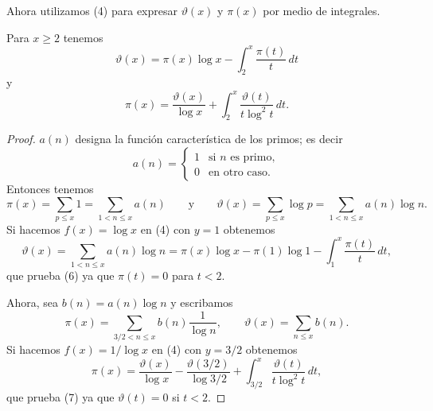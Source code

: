 \documentclass[12pt,a4paper]{book}
\begin{document}
    Ahora utilizamos (4) para expresar $\vartheta(x)$ y $\pi(x)$ por medio de
    integrales.

    \begin{teorema}
        Para $x\geq2$ tenemos
        \begin{equation}
            \vartheta(x)=\pi(x)\log x-\int_2^x\frac{\pi(t)}{t}\,dt
        \end{equation}
        y
        \begin{equation}
            \pi(x)=\frac{\vartheta(x)}{\log x}+\int_2^x\frac{\vartheta(t)}{t\log^2t}\,dt.
        \end{equation}
    \end{teorema}

    \begin{proof}
        $a(n)$ designa la función característica de los primos; es decir
        \begin{equation*}
            a(n)=
            \begin{cases}
                1 & \text{si } n \text{ es primo},\\
                0 & \text{en otro caso}.
            \end{cases}
        \end{equation*}
        Entonces tenemos
        \begin{equation*}
            \pi(x)=\sum_{p\leq x}1=\sum_{1<n\leq x}a(n)\qquad\text{y}\qquad
            \vartheta(x)=\sum_{p\leq x}\log p=\sum_{1<n\leq x}a(n)\log n.
        \end{equation*}
        Si hacemos $f(x)=\log x$ en (4) con $y=1$ obtenemos
        \begin{equation*}
            \vartheta(x)=\sum_{1<n\leq x}a(n)\log n=\pi(x)\log x-\pi(1)\log1-\int_1^x\frac{\pi(t)}{t}\,dt,
        \end{equation*}
        que prueba (6) ya que $\pi(t)=0$ para $t<2$.

        Ahora, sea $b(n)=a(n)\log n$ y escribamos
        \begin{equation*}
            \pi(x)=\sum_{3/2<n\leq x}b(n)\frac{1}{\log n},\qquad \vartheta(x)=\sum_{n\leq x}b(n).
        \end{equation*}
        Si hacemos $f(x)=1/\log x$ en (4) con $y=3/2$ obtenemos
        \begin{equation*}
            \pi(x)=\frac{\vartheta(x)}{\log x}-\frac{\vartheta(3/2)}{\log3/2}
            +\int_{3/2}^x\frac{\vartheta(t)}{t\log^2t}\,dt,
        \end{equation*}
        que prueba (7) ya que $\vartheta(t)=0$ si $t<2$.
    \end{proof}
\end{document}
